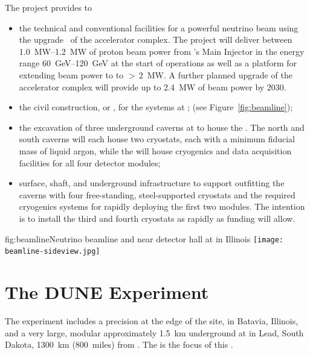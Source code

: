 The  project provides to 
\begin{itemize}
\item  the  technical and conventional facilities for a powerful neutrino beam using the  upgrade~\cite{pip2-2013} of the  accelerator 
complex. The  project will deliver between \SIrange{1.0}{1.2}{MW} of proton beam power from 's Main Injector in the energy range  \SIrange{60}{120}{GeV} at the start of  operations as well as a platform for extending beam power to  to %
$>\,$\SI{2}{MW}. %
A further planned upgrade 
of the accelerator complex will provide up to \SI{2.4}{\MW} of beam power by 2030. 

\item  the civil construction, or , for the  systems at ; (see Figure~\ref{fig:beamline});

\item the excavation of three underground caverns at  to house the  . The north and south caverns will each house two cryostats, each with a
 minimum \nominalmodsize fiducial mass of liquid argon, while the  will house cryogenics and data acquisition facilities for all four detector modules;

\item surface, shaft, and underground infrastructure to support 
outfitting the caverns with four free-standing, steel-supported cryostats 
and the required cryogenics systems for rapidly deploying the first two \nominalmodsize {} modules. 
The intention is to install the third and fourth cryostats as rapidly as funding will 
allow.

\end{itemize}


\begin{dunefigure}{fig:beamline}{Neutrino beamline and  near detector hall at  in Illinois}
\texttt{[image: beamline-sideview.jpg]}
\end{dunefigure}



\section{The DUNE Experiment}

The  experiment includes a precision  at the edge of the  site, in Batavia, Illinois, and a very large, modular  approximately \SI{1.5}{km} underground at  in Lead, South Dakota, \SI{1300}{km} (\SI{800}{miles}) from . The   is the focus of this . 

